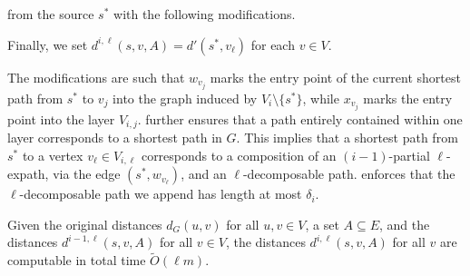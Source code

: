 \documentclass{theoretics}
\newcommand*{\Otilde}{\widetilde{O}}
\renewcommand{\leq}{\leqslant}
\begin{document}
from the source $s^*$ with the following modifications.
Finally, we set $d^{i,\ell}(s,v,A) = d'(s^*, v_{\ell})$ for each $v \in V$.

The modifications are such that $w_{v_j}$ marks the entry point of the current shortest path from $s^*$ to $v_j$ into the graph induced by $V_i{\setminus}\{s^*\}$, 
while $x_{v_j}$ marks the entry point into the layer $V_{i,j}$.
 further ensures that a path entirely contained within one layer
corresponds to a shortest path in $G$.
This implies that a shortest path from $s^*$ to a vertex $v_\ell \in V_{i,\ell}$
corresponds to a composition of an $(i{-}1)$-partial $\ell$-expath, via the edge $(s^*,w_{v_\ell})$,
and an $\ell$-decomposable path.
 enforces that the $\ell$-decomposable path we append
has length at most $\delta_i$.

\begin{lemma}
\label{lem:l-expath}
	Given the original distances $d_G(u,v)$ for all $u,v \in V$, 
	a set $A \subseteq E$, and the distances $d^{i-1,\ell}(s,v,A)$ for all $v \in V$,
	the distances $d^{i,\ell}(s, v, A)$ for all $v$ are computable in total time $\Otilde(\ell m)$.
\end{lemma}
\end{document}
